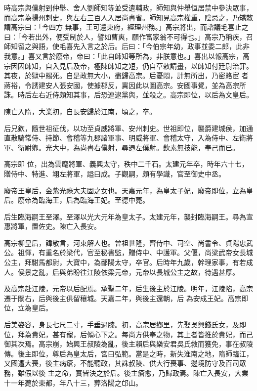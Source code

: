 \begin{pinyinscope}
 時高宗與僕射到仲舉、舍人劉師知等並受遺輔政，師知與仲舉恒居禁中參決眾事，而高宗為揚州刺史，與左右三百人入居尚書省。師知見高宗權重，陰忌之，乃矯敕謂高宗曰：「今四方
 無事，王可還東府，經理州務。」高宗將出，而諮議毛喜止之曰：「今若出外，便受制於人，譬如曹爽，願作富家翁不可得也。」高宗乃稱疾，召師知留之與語，使毛喜先入言之於后。后曰：「今伯宗年幼，政事並委二郎，此非我意。」喜又言於廢帝，帝曰：「此自師知等所為，非朕意也。」喜出以報高宗，高宗因囚師知，自入見后及帝，極陳師知之短，仍自草敕請畫，以師知付廷尉治罪。其夜，於獄中賜死。自是政無大小，盡歸高宗。后憂悶，計無所出，乃密賂宦
 者蔣裕，令誘建安人張安國，使據郡反，冀因此以圖高宗。安國事覺，並為高宗所誅。時后左右近侍頗知其事，后恐連逮黨與，並殺之。高宗即位，以后為文皇后。



 陳亡入隋，大業初，自長安歸於江南，頃之，卒。



 后兄欽，隨世祖征伐，以功至貞威將軍、安州刺史。世祖即位，襲爵建城侯，加通直散騎常侍、持節、會稽等九郡諸軍事、明威將軍、會稽太守，入為侍中、左衛將軍、衛尉卿。光大中，為尚書右僕射，尋遷左僕射。欽素無技能，奉己而已。



 高宗即
 位，出為雲麾將軍、義興太守，秩中二千石。太建元年卒，時年六十七，贈侍中、特進、翊左將軍，謚曰成。子觀嗣，頗有學識，官至御史中丞。



 廢帝王皇后，金紫光祿大夫固之女也。天嘉元年，為皇太子妃，廢帝即位，立為皇后。廢帝為臨海王，后為臨海王妃。至德中薨。



 后生臨海嗣王至澤。至澤以光大元年為皇太子。太建元年，襲封臨海嗣王。尋為宣惠將軍，置佐史。陳亡入長安。



 高宗柳皇后，諱敬言，河東解人也。曾祖世隆，齊侍中、司空、尚書令、貞陽忠武公。祖惲，有重名於梁代，官至秘書監，贈侍中、中護軍。父偃，尚梁武帝女長城公主，拜駙馬都尉，大寶中，為鄱陽太守，卒官。后時年九歲，幹理家事，有若成人。侯景之亂，后與弟盼往江陵依梁元帝，元帝以長城公主之故，待遇甚厚。



 及高宗赴江陵，元帝以后配焉。承聖二年，后生後主於江陵。明年，江陵陷，高宗遷于關右，后與後主俱留穰城。天嘉二年，與後主還朝，后
 為安成王妃。高宗即位，立為皇后。



 后美姿容，身長七尺二寸，手垂過膝。初，高宗居鄉里，先娶吳興錢氏女，及即位，拜為貴妃，甚有寵，后傾心下之。每尚方供奉之物，其上者皆推於貴妃，而己御其次焉。高宗崩，始興王叔陵為亂，後主賴后與樂安君吳氏救而獲免，事在叔陵傳。後主即位，尊后為皇太后，宮曰弘範。當是之時，新失淮南之地，隋師臨江，又國遭大喪，後主病瘡，不能聽政，其誅叔陵、供大行喪事、邊境防守及百司眾務，雖假以後
 主之命，實皆決之於后。後主瘡愈，乃歸政焉。陳亡入長安，大業十一年薨於東都，年八十三，葬洛陽之邙山。




\end{pinyinscope}
